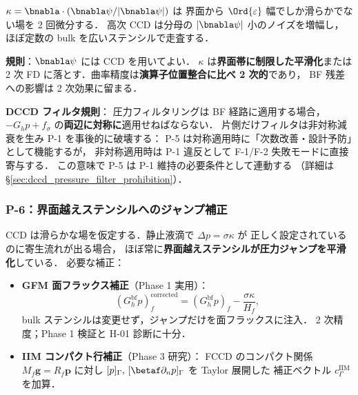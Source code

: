 $\kappa = \bnabla\cdot(\bnabla\psi/|\bnabla\psi|)$ は
界面から $\Ord{\varepsilon}$ 幅でしか滑らかでない場を 2 回微分する．
高次 CCD は分母の $|\bnabla\psi|$ 小のノイズを増幅し，
ほぼ定数の bulk を広いステンシルで走査する．

\noindent\textbf{規則}：$\bnabla\psi$ には CCD を用いてよい．
$\kappa$ は\textbf{界面帯に制限した平滑化}または
2 次 FD に落とす．曲率精度は\textbf{演算子位置整合に比べ 2 次的}であり，
BF 残差への影響は 2 次効果に留まる．

\noindent\textbf{DCCD フィルタ規則}：
圧力フィルタリングは BF 経路に適用する場合，
$-G_h p + f_\sigma$ の\textbf{両辺に対称に}適用せねばならない．
片側だけフィルタは非対称減衰を生み P-1 を事後的に破壊する：
P-5 は対称適用時に「次数改善・設計予防」として機能するが，
非対称適用時は P-1 違反として F-1/F-2 失敗モードに直接寄与する．
この意味で P-5 は P-1 維持の必要条件として連動する
（詳細は §\ref{sec:dccd_pressure_filter_prohibition}）．

\subsubsection{P-6：界面越えステンシルへのジャンプ補正}
\label{sec:bf_p6_jump}

CCD は滑らかな場を仮定する．静止液滴で $\Delta p = \sigma\kappa$ が
正しく設定されているのに寄生流れが出る場合，
ほぼ常に\textbf{界面越えステンシルが圧力ジャンプを平滑化}している．
必要な補正：
\begin{itemize}[noitemsep]
  \item \textbf{GFM 面フラックス補正}（Phase 1 実用）：
  \begin{equation}
    (G_h^\text{bf} p)_f^\text{corrected}
      = (G_h^\text{bf} p)_f - \frac{\sigma\kappa}{H_f},
    \label{eq:bf_p6_gfm}
  \end{equation}
  bulk ステンシルは変更せず，ジャンプだけを面フラックスに注入．
  2 次精度；Phase 1 検証と H-01 診断に十分．
  \item \textbf{IIM コンパクト行補正}（Phase 3 研究）：
  FCCD のコンパクト関係 $M_f\mathbf{g} = R_f\mathbf{p}$ に対し
  $[p]_\Gamma,\,[\betaf\partial_n p]_\Gamma$ を Taylor 展開した
  補正ベクトル $c_\Gamma^\text{IIM}$ を加算．
\end{itemize}

